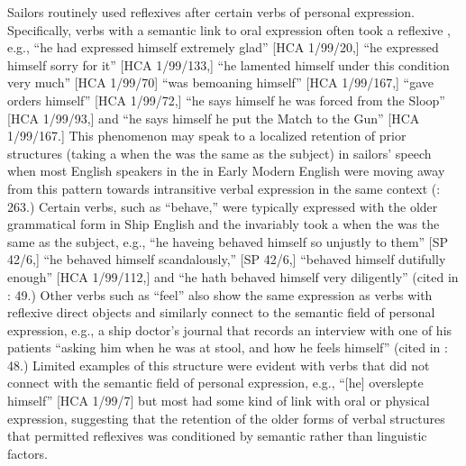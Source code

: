Sailors routinely used reflexives after certain verbs of personal expression. Specifically, verbs with a semantic link to oral expression often took a reflexive , e.g., “he had expressed himself extremely glad” [HCA 1/99/20,] “he expressed himself sorry for it” [HCA 1/99/133,] “he lamented himself under this condition very much” [HCA 1/99/70] “was bemoaning himself” [HCA 1/99/167,] “gave orders himself” [HCA 1/99/72,] “he says himself he was forced from the Sloop” [HCA 1/99/93,] and “he says himself he put the Match to the Gun” [HCA 1/99/167.] This phenomenon may speak to a localized retention of prior  structures (taking a  when the  was the same as the subject) in sailors’ speech when most English speakers in the in Early Modern English were moving away from this pattern towards intransitive verbal expression in the same context (\citealt{MillwardHayes2012}: 263.) Certain verbs, such as “behave,” were typically expressed with the older  grammatical form in Ship English and the  invariably took a  when the  was the same as the subject, e.g., “he haveing behaved himself so unjustly to them” [SP 42/6,] “he behaved himself scandalously,” [SP 42/6,] “behaved himself dutifully enough” [HCA 1/99/112,] and “he hath behaved himself very diligently” (cited in \citealt{Brown2011}: 49.) Other verbs such as “feel” also show the same expression as  verbs with reflexive direct objects and similarly connect to the semantic field of personal expression, e.g., a ship doctor’s journal that records an interview with one of his patients “asking him when he was at stool, and how he feels himself” (cited in \citealt{Brown2011}: 48.) Limited examples of this structure were evident with verbs that did not connect with the semantic field of personal expression, e.g., “[he] overslepte himself” [HCA 1/99/7] but most had some kind of link with oral or physical expression, suggesting that the retention of the older forms of  verbal structures that permitted reflexives was conditioned by semantic rather than linguistic factors. 

